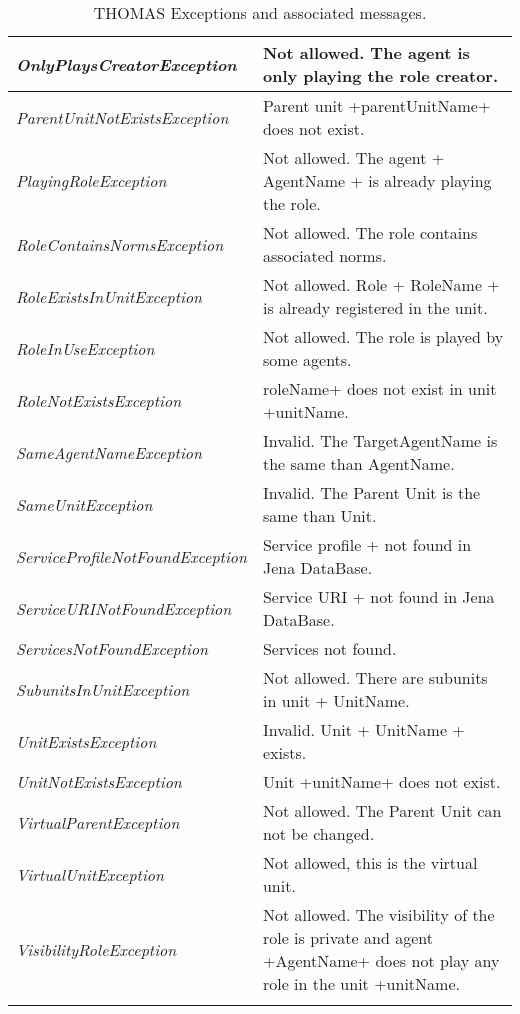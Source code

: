 \begin{longtable}{|p{6.5cm}|p{7.2cm}|}
  \emph{OnlyPlaysCreatorException} & Not allowed. The agent is only playing the role creator. \\ \hline
  \emph{ParentUnitNotExistsException} & Parent unit +parentUnitName+ does not exist. \\ \hline
  \emph{PlayingRoleException} & Not allowed. The agent + AgentName +  is already playing the role.  \\ \hline
  \emph{RoleContainsNormsException} & Not allowed. The role contains associated norms. \\ \hline
  \emph{RoleExistsInUnitException} & Not allowed. Role + RoleName +  is already registered in the unit. \\ \hline
  \emph{RoleInUseException} & Not allowed. The role is played by some agents. \\ \hline
  \emph{RoleNotExistsException} & roleName+ does not exist in unit +unitName. \\ \hline
  \emph{SameAgentNameException} & Invalid. The TargetAgentName is the same than AgentName. \\ \hline
  \emph{SameUnitException} & Invalid. The Parent Unit is the same than Unit. \\ \hline
  \emph{ServiceProfileNotFoundException} & Service profile + not found in Jena DataBase. \\ \hline
  \emph{ServiceURINotFoundException} & Service URI + not found in Jena DataBase. \\ \hline
  \emph{ServicesNotFoundException} & Services not found. \\ \hline
  \emph{SubunitsInUnitException} & Not allowed. There are subunits in unit + UnitName. \\ \hline
  \emph{UnitExistsException} & Invalid. Unit + UnitName +  exists. \\ \hline
  \emph{UnitNotExistsException} & Unit +unitName+ does not exist. \\ \hline
  \emph{VirtualParentException} & Not allowed. The Parent Unit can not be changed. \\ \hline
  \emph{VirtualUnitException} & Not allowed, this is the virtual unit. \\ \hline
  \emph{VisibilityRoleException} & Not allowed. The visibility of the role is private and agent +AgentName+ does not play any role in the unit +unitName. \\ \hline
  
\caption{THOMAS Exceptions and associated messages.}
\end{longtable}

